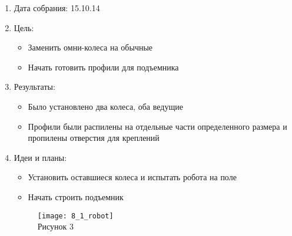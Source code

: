 \documentclass[11pt]{article}
\begin{document}
	\begin{enumerate}
	\item Дата собрания: 15.10.14
	\item Цель:
		\begin{itemize}
		\item Заменить омни-колеса на обычные
		\item Начать готовить профили для подъемника
		\end{itemize}
	\item Результаты:
		\begin{itemize}
		\item Было установлено два колеса, оба ведущие
		\item Профили были распилены на отдельные части определенного размера и пропилены отверстия для креплений
		\end{itemize}
	\item Идеи и планы:
		\begin{itemize}
		\item Установить оставшиеся колеса и испытать робота на поле
		\item Начать строить подъемник
		\end{itemize}
		\begin{figure} [h]
			\centering
			\begin{minipage}{0.3\linewidth}
				\texttt{[image: 8\_1\_robot]}\\ Рисунок 3
			\end{minipage}
		\end{figure}
	\end{enumerate}
\end{document}
